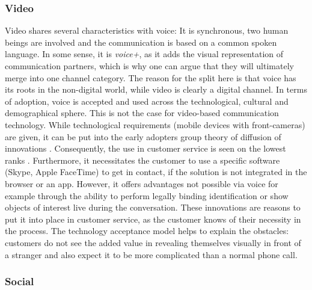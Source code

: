 		\subsubsection{Video}
		Video shares several characteristics with voice: It is synchronous, two human beings are involved and the communication is based on a common spoken language. In some sense, it is \textit{voice+}, as it adds the visual representation of communication partners, which is why one can argue that they will ultimately merge into one channel category. The reason for the split here is that voice has its roots in the non-digital world, while video is clearly a digital channel. In terms of adoption, voice is accepted and used across the technological, cultural and demographical sphere. This is not the case for video-based communication technology. While technological requirements (\ie mobile devices with front-cameras)  are given, it can be put into the early adopters group \wrt theory of diffusion of innovations \citep{rogers2010diffusion}. Consequently, the use in customer service is seen on the lowest ranks \citep{DimensionData2015}.  Furthermore, it necessitates the customer to use a specific software (\ie Skype, Apple FaceTime) to get in contact, if the solution is not integrated in the browser or an app. However, it offers advantages not possible via voice for example through the ability to perform legally binding identification or show objects of interest live during the conversation. These innovations are reasons to put it into place in customer service, as the customer knows of their necessity in the process. The technology acceptance model \citep{Adams_1992} helps to explain the obstacles: customers do not see the added value in revealing themselves visually in front of a stranger and also expect it to be more complicated than a normal phone call. 
		
		\subsubsection{Social}
		
